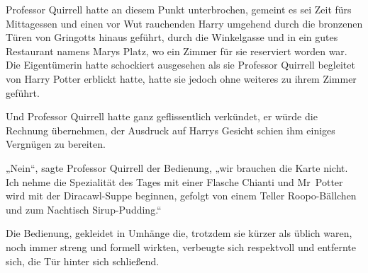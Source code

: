 Professor Quirrell hatte an diesem Punkt unterbrochen, gemeint es sei Zeit fürs Mittagessen und einen vor Wut rauchenden Harry umgehend durch die bronzenen Türen von Gringotts hinaus geführt, durch die Winkelgasse und in ein gutes Restaurant namens Marys Platz, wo ein Zimmer für sie reserviert worden war. Die Eigentümerin hatte schockiert ausgesehen als sie Professor Quirrell begleitet von Harry Potter erblickt hatte, hatte sie jedoch ohne weiteres zu ihrem Zimmer geführt.

Und Professor Quirrell hatte ganz geflissentlich verkündet, er würde die Rechnung übernehmen, der Ausdruck auf Harrys Gesicht schien ihm einiges Vergnügen zu bereiten.

„Nein“, sagte Professor Quirrell der Bedienung, „wir brauchen die Karte nicht. Ich nehme die Spezialität des Tages mit einer Flasche Chianti und Mr~Potter wird mit der Diracawl-Suppe beginnen, gefolgt von einem Teller Roopo-Bällchen und zum Nachtisch Sirup-Pudding.“

Die Bedienung, gekleidet in Umhänge die, trotzdem sie kürzer als üblich waren, noch immer streng und formell wirkten, verbeugte sich respektvoll und entfernte sich, die Tür hinter sich schließend.


